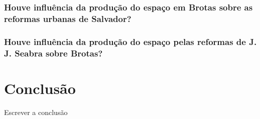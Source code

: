 \documentclass[
	12pt,					%
	openright,			%
	twoside,			%
	a4paper,			%
	english,				%
	french,				%
	spanish,			%
	brazil				%
	]{abntex2}
\begin{document}
\lipsum[50]
\cite{AZEVEDO1969}

\subsection{Houve influência da produção do espaço em Brotas sobre as reformas urbanas de Salvador?}\label{subsec:3.3.1}

\lipsum[50]
\cite{AGUIAR1957}

\subsection[Houve influência da produção do espaço pelas reformas de J. J. Seabra sobre Brotas?]{Houve influência da produção do espaço pelas reformas de J. J. Seabra sobre Brotas?}\label{subsec:3.3.2}

\lipsum[50]
\cite{AGUIAR1958}


\chapter*[Conclusão]{Conclusão}\label{concl}

\lipsum[50]


Escrever a conclusão

\postextual



%
%

\end{document}
